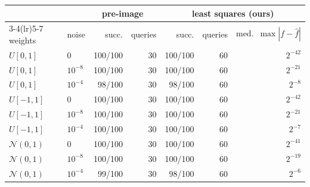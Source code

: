 \begin{tabular}{llrrrrr}
\toprule
 & & \multicolumn{2}{c}{pre-image~\cite{DBLP:conf/crypto/CarliniJM20}} & \multicolumn{3}{c}{least squares (ours)}\\
\cmidrule(lr){3-4}\cmidrule(lr){5-7}
weights & noise & succ. & queries & succ. & queries & med.\ $\max|f-\hat f|$\\
\midrule
$U[0,1]$ & $0$ & 100/100 & 30 & 100/100 & 60 & $2^{-42}$\\
$U[0,1]$ & $10^{-8}$ & 100/100 & 30 & 100/100 & 60 & $2^{-21}$\\
$U[0,1]$ & $10^{-4}$ & 98/100 & 30 & 98/100 & 60 & $2^{-8}$\\
$U[-1,1]$ & $0$ & 100/100 & 30 & 100/100 & 60 & $2^{-42}$\\
$U[-1,1]$ & $10^{-8}$ & 100/100 & 30 & 100/100 & 60 & $2^{-21}$\\
$U[-1,1]$ & $10^{-4}$ & 100/100 & 30 & 100/100 & 60 & $2^{-7}$\\
$\mathcal N(0,1)$ & $0$ & 100/100 & 30 & 100/100 & 60 & $2^{-41}$\\
$\mathcal N(0,1)$ & $10^{-8}$ & 100/100 & 30 & 100/100 & 60 & $2^{-19}$\\
$\mathcal N(0,1)$ & $10^{-4}$ & 99/100 & 30 & 98/100 & 60 & $2^{-6}$\\
\bottomrule
\end{tabular}

